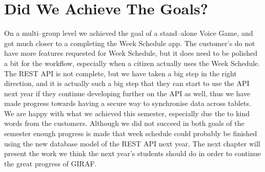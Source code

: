 \section{Did We Achieve The Goals?}
On a multi--group level we achieved the goal of a stand--alone Voice Game, and got much closer to a completing the Week Schedule app.
The customer's do not have more features requested for Week Schedule, but it does need to be polished a bit for the workflow, especially when a citizen actually uses the Week Schedule.
The REST API is not complete, but we have taken a big step in the right direction, and it is actually such a big step that they can start to use the API next year if they continue developing further on the API as well, thus we have made progress towards having a secure way to synchronise data across tablets.
We are happy with what we achieved this semester, especially due the to kind words from the customers.
Although we did not succeed in both goals of the semester enough progress is made that week schedule could probably be finished using the new database model of the REST API next year.
The next chapter will present the work we think the next year's students should do in order to continue the great progress of GIRAF.

